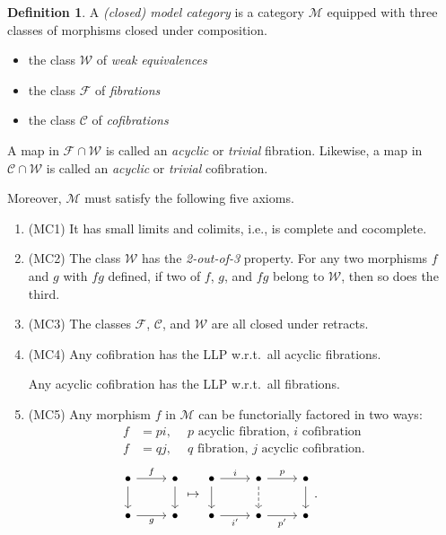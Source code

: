 \documentclass[10pt,letterpaper,cm]{nupset}
\theoremstyle{definition}
\newtheorem{defn}{Definition}[subsection]
\theoremstyle{theorem}
\theoremstyle{remark}
\newcommand{\1}{\mathbb{1}}
\newcommand{\cf}{\mathscr{C}}
\newcommand{\f}{\mathscr{F}}
\newcommand{\m}{\mathcal{M}}
\newcommand{\w}{\mathscr{W}}
\newcommand{\0}{\vec 0}
\newcommand{\bi}{\begin{itemize}}
\newcommand{\ei}{\end{itemize}}
\newcommand{\be}{\begin{enumerate}}
\newcommand{\ee}{\end{enumerate}}
\begin{document}
\begin{defn}
A \textit{(closed) model category} is a category $\m$ equipped with three classes of morphisms closed under composition.
\bi
\item the class $\w$ of \textit{weak equivalences}
\item the class $\f$ of \textit{fibrations}
\item the class $\cf$ of \textit{cofibrations}
\ei
A  map in $\f \cap \w$ is called an \textit{acyclic} or \textit{trivial} fibration. Likewise, a  map in $\cf \cap \w$ is called an \textit{acyclic} or \textit{trivial} cofibration. 

\smallskip

Moreover, $\m$ must satisfy the following five axioms.
\be
\item[(MC1)] It has small limits and colimits, i.e., is complete and cocomplete.
\item[(MC2)] The class $\w$ has the \textit{2-out-of-3} property. For any two morphisms $f$ and $g$ with $fg$ defined, if two of $f$, $g$, and $fg$ belong to $\w$, then so does the third.
\item[(MC3)] The classes $\f$, $\cf$, and $\w$ are all closed under retracts.
\item[(MC4)] Any cofibration has the LLP w.r.t.\ all acyclic fibrations.

Any acyclic cofibration has the LLP w.r.t.\ all fibrations. 
\item[(MC5)] Any morphism $f$ in $\m$ can be functorially factored in two ways:
\begin{align*}
f & = pi, \ \quad \text{$p$ acyclic fibration, $i$ cofibration} 
\\ f & = qj, \ \quad  \text{$q$ fibration, $j$  acyclic cofibration} 
.
\end{align*}
\[
 \begin{tikzcd}
	\bullet & \bullet \\
	\bullet & \bullet
	\arrow["f", from=1-1, to=1-2]
	\arrow["g"', from=2-1, to=2-2]
	\arrow[from=1-1, to=2-1]
	\arrow[from=1-2, to=2-2]
\end{tikzcd}  \mapsto 
\begin{tikzcd}
	\bullet & \bullet & \bullet \\
	\bullet & \bullet & \bullet
	\arrow["i", from=1-1, to=1-2]
	\arrow["{i'}"', from=2-1, to=2-2]
	\arrow[from=1-1, to=2-1]
	\arrow[dashed, from=1-2, to=2-2]
	\arrow["{p'}"', from=2-2, to=2-3]
	\arrow["p", from=1-2, to=1-3]
	\arrow[from=1-3, to=2-3]
\end{tikzcd}. \quad \quad \quad \quad 
\]

\ee
\end{defn}
\end{document}
